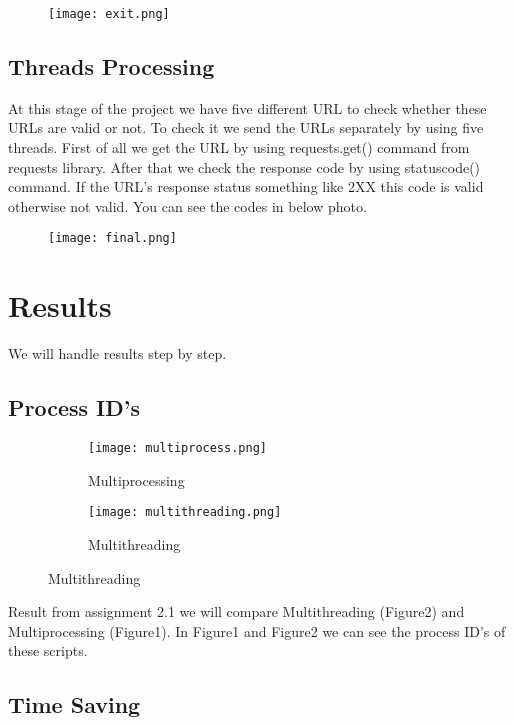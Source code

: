 \documentclass[onecolumn]{article}
\begin{document}
\begin{figure}[h]
\texttt{[image: exit.png]}
\centering
\end{figure}

\subsection{Threads Processing}
At this stage of the project we have five different URL to check whether these URLs are valid or not. To check it we send the URLs separately by using five threads. First of all we get the URL by using requests.get() command from requests library. After that we check the response code by using statuscode() command. If the URL's response status something like 2XX this code is valid otherwise not valid. You can see the codes in below photo.

\begin{figure}[h]
\texttt{[image: final.png]}
\centering
\end{figure}


\section{Results}
We will handle results step by step.

\subsection{Process ID's}


\begin{figure}[h]

\begin{subfigure}{\textwidth}
\texttt{[image: multiprocess.png]} 
\caption{Multiprocessing}
\label{fig:multiprocess}
\end{subfigure}
\begin{subfigure}{\textwidth}
\texttt{[image: multithreading.png]}
\caption{Multithreading}
\label{fig:subim2}
\end{subfigure}
\end{figure}


Result from assignment 2.1 we will compare Multithreading (Figure2) and Multiprocessing (Figure1). In Figure1 and Figure2 we can see the process ID's of these scripts.

\subsection{Time Saving}
\end{document}
